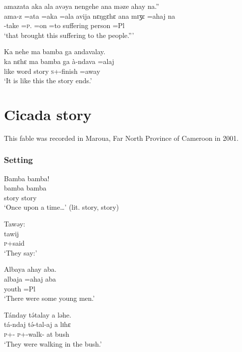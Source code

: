  \medskip
  amazata  aka  ala  avəya  nengehe  ana  məze  ahay  na.”\\
\gll ama-z  =ata      =aka  =ala      avija    nɛŋgɛhɛ  ana    mɪʒɛ  =ahaj   na\\
 {\DEP}-take  =\textsc{p}.{\IO}   =on     =to  suffering  {\DEM}      {\DAT} person    =Pl  {\PSP}\\
 \glt ‘that brought this suffering to the people.”’ 
 \z

 \ea  Ka  nehe  ma  bamba  ga  andavalay.    \\
 \gll ka  nɛhɛ  ma  bamba   ga  à-ndava    =alaj\\
 like  {\DEM}  word   story     {\ADJ}     \textsc{s}+{\PFV}-finish  =away \\
 \glt ‘It is like this the story ends.’  
 \z
 
% 
\section[Cicada story]{Cicada story\\\hspace{1.5em} \textnormal{}}\setcounter{equation}{0}\label{sec:1.6}
\hypertarget{RefHeading1210361525720847}{}
This fable was recorded in Maroua, Far North Province of Cameroon in 2001.  
% 
\subsubsection*{Setting}
\ea   Bamba  bamba!\\
\gll bamba   bamba\\
	        story         story   \\
\glt ‘Once upon a time…’ (lit. story, story)
 \z

\ea Tawəy: \\
\gll   tawij \\
\textsc{p}+said  \\  
\glt ‘They say:’
  \z

\ea Albaya  ahay  aba.\\
 \gll albaja  =ahaj              aba\\
        youth      =Pl    {\EXT}\\
 \glt ‘There were some young men.’
  \z

\ea Tánday  t\'ətalay  a  ləhe.\\
 \gll tá{}-ndaj         t\'ə{}-tal-aj           a  lɪhɛ\\
   \textsc{p}+{\IFV}-{\PRG}   \textsc{p}+{\IFV}-walk{}-{\CL}   at    bush\\
 \glt ‘They were walking in the bush.’
 \z
